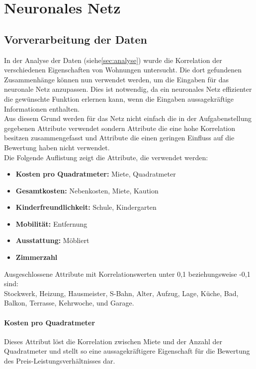 \section{Neuronales Netz}\label{sec:nn}
\subsection{Vorverarbeitung der Daten}
In der Analyse der Daten (siehe\autoref{sec:analyse}) wurde die Korrelation 
der verschiedenen Eigenschaften von Wohnungen untersucht. Die dort gefundenen
Zusammenhänge können nun verwendet werden, um die Eingaben für das neuronale 
Netz anzupassen. Dies ist notwendig, da ein neuronales Netz effizienter
die gewünschte Funktion erlernen kann, wenn die Eingaben aussagekräftige 
Informationen enthalten. \\
Aus diesem Grund werden für das Netz nicht einfach die in der Aufgabenstellung 
gegebenen Attribute verwendet sondern Attribute die eine hohe Korrelation besitzen
zusammengefasst und Attribute die einen geringen Einfluss auf die Bewertung haben
nicht verwendet. \\
Die Folgende Auflistung zeigt die Attribute, die verwendet werden: 
\begin{itemize}\label{lst:Eigenschaften}
    \item \textbf{Kosten pro Quadratmeter:} Miete, Quadratmeter
    \item \textbf{Gesamtkosten:} Nebenkosten, Miete, Kaution
    \item \textbf{Kinderfreundlichkeit:} Schule, Kindergarten
    \item \textbf{Mobilität:} Entfernung
    \item \textbf{Ausstattung:} Möbliert
    \item \textbf{Zimmerzahl}
\end{itemize}

Ausgeschlossene Attribute mit Korrelationswerten unter 0,1 beziehungsweise -0,1 sind:\\
Stockwerk, Heizung, Hausmeister, S-Bahn, Alter, Aufzug, Lage, Küche, Bad, Balkon, Terrasse, Kehrwoche, 
und Garage.

\paragraph{Kosten pro Quadratmeter}
Dieses Attribut löst die Korrelation zwischen Miete und der Anzahl der Quadratmeter und 
stellt so eine aussagekräftigere Eigenschaft für die Bewertung des Preis-Leistungsverhältnisses dar.


